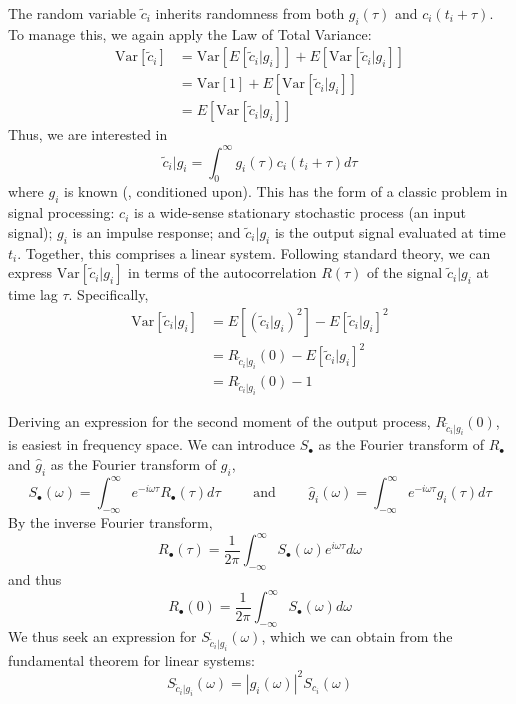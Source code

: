  The random variable $\tilde{c}_i$ inherits randomness from both $g_i(\tau)$ and $c_i(t_i+\tau)$. To manage this, we again apply the Law of Total Variance: 
\begin{align}
	\text{Var}[\tilde{c}_i] &= \text{Var}[E[\tilde{c}_i | g_i ]] + E[\text{Var}[\tilde{c}_i | g_i ]] \\ 
	&= \text{Var}[1] + E[\text{Var}[\tilde{c}_i | g_i ]] \\ 
	&= E[\text{Var}[\tilde{c}_i | g_i ]]
\end{align}
Thus, we are interested in 
\begin{equation}
\tilde{c}_i | g_i = \int_0^\infty g_i(\tau) c_i(t_i+\tau) d\tau 
\end{equation}
where $g_i$ is known (\ie, conditioned upon). This has the form of a classic problem in signal processing: $c_i$ is a wide-sense stationary stochastic process (an input signal); $g_i$ is an impulse response; and $\tilde{c}_i | g_i$ is the output signal evaluated at time $t_i$. Together, this comprises a linear system. Following standard theory, we can express $\text{Var}[\tilde{c}_i | g_i]$ in terms of the autocorrelation $R(\tau)$ of the signal $\tilde{c}_i | g_i$ at time lag $\tau$. Specifically, 
\begin{align}
	\text{Var}[\tilde{c}_i | g_i] &= E[(\tilde{c}_i | g_i)^2]  - E[\tilde{c}_i | g_i]^2  \\ 
	&= 	R_{\tilde{c}_i | g_i}(0) - E[\tilde{c}_i | g_i]^2 \\
	&= 	R_{\tilde{c}_i | g_i}(0) - 1 
\end{align}

 Deriving an expression for the second moment of the output process, $R_{\tilde{c}_i | g_i}(0)$, is easiest in frequency space. We can introduce $S_\bullet$ as the Fourier transform of $R_\bullet$ and $\hat{g}_i$ as the Fourier transform of $g_i$, \ie 
\begin{equation}
S_\bullet(\omega) = \int_{-\infty}^{\infty} e^{-i \omega \tau} R_\bullet(\tau) d\tau 
\qquad \text{ and } \qquad 
\hat{g}_i(\omega) = \int_{-\infty}^{\infty} e^{-i \omega \tau} g_i(\tau) d\tau
\end{equation}
By the inverse Fourier transform, 
\begin{equation}
R_\bullet(\tau) = \frac{1}{2\pi} \int_{-\infty}^{\infty} S_\bullet(\omega) e^{i \omega \tau} d\omega
\end{equation}
and thus 
\begin{equation}
R_\bullet(0) = \frac{1}{2\pi} \int_{-\infty}^{\infty} S_\bullet(\omega) d\omega
\end{equation}
We thus seek an expression for $S_{\tilde{c}_i | g_i}(\omega)$, which we can obtain from the fundamental theorem for linear systems: 
\begin{equation}
	S_{\tilde{c}_i | g_i}(\omega) = |\hat{g}_i(\omega)|^2 S_{c_i}(\omega)
\end{equation}

